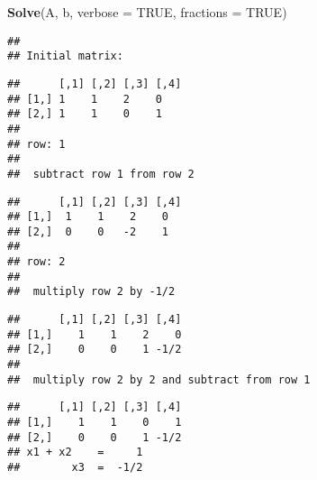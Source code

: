 \documentclass[
  10pt,
  a4paper,
]{article}
\newenvironment{Shaded}{\begin{snugshade}}{\end{snugshade}}
\newcommand{\AttributeTok}[1]{\textcolor[rgb]{0.13,0.29,0.53}{#1}}
\newcommand{\ConstantTok}[1]{\textcolor[rgb]{0.56,0.35,0.01}{#1}}
\newcommand{\FunctionTok}[1]{\textcolor[rgb]{0.13,0.29,0.53}{\textbf{#1}}}
\newcommand{\NormalTok}[1]{#1}
\begin{document}
\begin{Shaded}
\begin{Highlighting}[]
\FunctionTok{Solve}\NormalTok{(A, b, }\AttributeTok{verbose =} \ConstantTok{TRUE}\NormalTok{, }\AttributeTok{fractions =} \ConstantTok{TRUE}\NormalTok{)}
\end{Highlighting}
\end{Shaded}

\begin{verbatim}
## 
## Initial matrix:
\end{verbatim}

\begin{verbatim}
##      [,1] [,2] [,3] [,4]
## [1,] 1    1    2    0   
## [2,] 1    1    0    1   
## 
## row: 1 
## 
##  subtract row 1 from row 2
\end{verbatim}

\begin{verbatim}
##      [,1] [,2] [,3] [,4]
## [1,]  1    1    2    0  
## [2,]  0    0   -2    1  
## 
## row: 2 
## 
##  multiply row 2 by -1/2
\end{verbatim}

\begin{verbatim}
##      [,1] [,2] [,3] [,4]
## [1,]    1    1    2    0
## [2,]    0    0    1 -1/2
## 
##  multiply row 2 by 2 and subtract from row 1
\end{verbatim}

\begin{verbatim}
##      [,1] [,2] [,3] [,4]
## [1,]    1    1    0    1
## [2,]    0    0    1 -1/2
## x1 + x2    =     1 
##        x3  =  -1/2
\end{verbatim}
\end{document}

